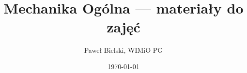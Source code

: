 \documentclass[a4paper]{article}
\title{Mechanika Ogólna --- materiały do zajęć}
\author{Paweł Bielski, WIMiO PG}
\date{\today}
\numberwithin{equation}{section} %
\begin{document}
\maketitle
\tableofcontents

 \FloatBarrier %
\newpage

 \FloatBarrier %
\newpage

 \FloatBarrier %
\newpage

 \FloatBarrier %
 \FloatBarrier %
\newpage

\end{document}
